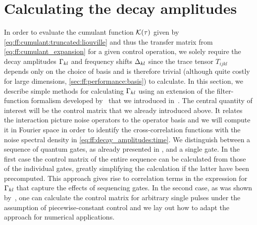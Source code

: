 
\section{Calculating the decay amplitudes}\label{sec:ff:theory:decay_amplitudes}
In order to evaluate the cumulant function $\mathcal{K}(\tau)$ given by \cref{eq:ff:cumulant:truncated:liouville} and thus the transfer matrix \liouvUetavg from \cref{eq:ff:cumulant_expansion} for a given control operation, we solely require the decay amplitudes $\Gamma_{kl}$ and frequency shifts $\Delta_{kl}$ since the trace tensor $T_{ijkl}$ depends only on the choice of basis and is therefore trivial (although quite costly for large dimensions, \cf \cref{sec:ff:performance:basis}) to calculate.
In this section, we describe simple methods for calculating $\Gamma_{kl}$ using an extension of the filter-function formalism developed by~\citet{Green2013} that we introduced in~.
The central quantity of interest will be the control matrix that we already introduced above.
It relates the interaction picture noise operators to the operator basis and we will compute it in Fourier space in order to identify the cross-correlation functions with the noise spectral density in \cref{eq:ff:decay_amplitudes:time}.
We distinguish between a sequence of quantum gates, as already presented in , and a single gate.
In the first case the control matrix of the entire sequence can be calculated from those of the individual gates, greatly simplifying the calculation if the latter have been precomputed.
This approach gives rise to correlation terms in the expression for $\Gamma_{kl}$ that capture the effects of sequencing gates.
In the second case, as was shown by~\citet{Green2013}, one can calculate the control matrix for arbitrary single pulses under the assumption of piecewise-constant control and we lay out how to adapt the approach for numerical applications.

